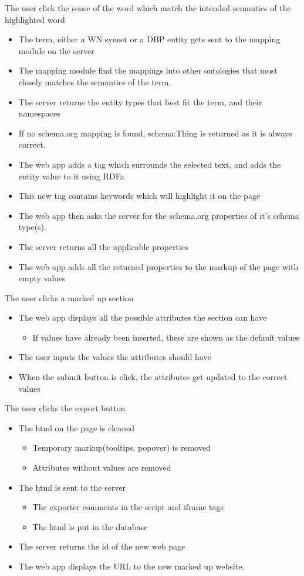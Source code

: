 The user click the sense of the word which match the intended semantics of the highlighted word
\begin{itemize}
	\item The term, either a WN synset or a DBP entity gets sent to the mapping module on the server
	\item The mapping module find the mappings into other ontologies
		that most closely matches the semantics of the term.
	\item The server returns the entity types that best fit the term, and their namespaces
		\item If no schema.org mapping is found, schema:Thing is returned as it is always correct.
	\item The web app adds a tag which surrounds the selected text, and adds the entity value to it using RDFa
		\item This new tag contains keywords which will highlight it on the page
	\item The web app then asks the server for the schema.org properties of it's schema type(s).
	\item The server returns all the applicable properties
	\item The web app adds all the returned properties to the markup of the page with empty values
\end{itemize}
The user clicks a marked up section
\begin{itemize}
	\item The web app displays all the possible attributes the section can have
	\begin{itemize}
		\item If values have already been inserted, these are shown as the default values
	\end{itemize}
	\item The user inputs the values the attributes should have
	\item When the submit button is click, the attributes get updated to the correct values
\end{itemize}
The user clicks the export button
\begin{itemize}
	\item The html on the page is cleaned
	\begin{itemize}
		\item Temporary markup(tooltips, popover) is removed
		\item Attributes without values are removed
	\end{itemize}
	\item The html is sent to the server
	\begin{itemize}
		\item The exporter comments in the script and iframe tags
		\item The html is put in the database
	\end{itemize}
	\item The server returns the id of the new web page
	\item The web app displays the URL to the new marked up website.
\end{itemize}
